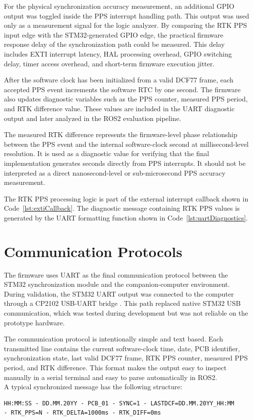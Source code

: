 For the physical synchronization accuracy measurement, an additional GPIO output was toggled inside the PPS interrupt handling path. This output was used only as a measurement signal for the logic analyzer. By comparing the RTK PPS input edge with the STM32-generated GPIO edge, the practical firmware response delay of the synchronization path could be measured. This delay includes EXTI interrupt latency, HAL processing overhead, GPIO switching delay, timer access overhead, and short-term firmware execution jitter.

After the software clock has been initialized from a valid DCF77 frame, each accepted PPS event increments the software RTC by one second. The firmware also updates diagnostic variables such as the PPS counter, measured PPS period, and RTK difference value. These values are included in the UART diagnostic output and later analyzed in the ROS2 evaluation pipeline.

The measured RTK difference represents the firmware-level phase relationship between the PPS event and the internal software-clock second at millisecond-level resolution. It is used as a diagnostic value for verifying that the final implementation generates seconds directly from PPS interrupts. It should not be interpreted as a direct nanosecond-level or sub-microsecond PPS accuracy measurement.

The RTK PPS processing logic is part of the external interrupt callback shown in Code~\ref{lst:extiCallback}. The diagnostic message containing RTK PPS values is generated by the UART formatting function shown in Code~\ref{lst:uartDiagnostics}.

\section{Communication Protocols}

The firmware uses UART as the final communication protocol between the STM32 synchronization module and the companion-computer environment. During validation, the STM32 UART output was connected to the computer through a CP2102 USB-UART bridge \cite{cp2102Datasheet}. This path replaced native STM32 USB communication, which was tested during development but was not reliable on the prototype hardware.

The communication protocol is intentionally simple and text based. Each transmitted line contains the current software-clock time, date, PCB identifier, synchronization state, last valid DCF77 frame, RTK PPS counter, measured PPS period, and RTK difference. This format makes the output easy to inspect manually in a serial terminal and easy to parse automatically in ROS2.
\\
A typical synchronized message has the following structure:
\begin{verbatim}
HH:MM:SS - DD.MM.20YY - PCB_01 - SYNC=1 - LASTDCF=DD.MM.20YY_HH:MM
- RTK_PPS=N - RTK_DELTA=1000ms - RTK_DIFF=0ms
\end{verbatim}

